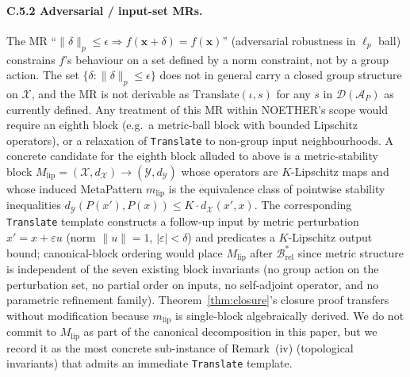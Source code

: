 \documentclass[acmsmall, screen]{acmart}
\begin{document}
\paragraph{C.5.2 Adversarial / input-set MRs.}
The MR ``$\| \delta\|_p \le \epsilon \Rightarrow f(\mathbf{x} + \delta) = f(\mathbf{x})$'' (adversarial robustness in $\ell_p$ ball) constrains $f$'s behaviour on a set defined by a norm constraint, not by a group action. The set $\{ \delta : \|\delta\|_p \le \epsilon\}$ does not in general carry a closed group structure on $\mathcal{X}$, and the MR is not derivable as $\mathrm{Translate}(\iota, s)$ for any $s$ in $\mathcal{D}(\mathcal{A}_P)$ as currently defined. Any treatment of this MR within NOETHER's scope would require an eighth block (e.g.\ a metric-ball block with bounded Lipschitz operators), or a relaxation of \texttt{Translate} to non-group input neighbourhoods. A concrete candidate for the eighth block alluded to above is a metric-stability block $M_{\mathrm{lip}} = (\mathcal{X}, d_{\mathcal{X}}) \to (\mathcal{Y}, d_{\mathcal{Y}})$ whose operators are $K$-Lipschitz maps and whose induced MetaPattern $m_{\mathrm{lip}}$ is the equivalence class of pointwise stability inequalities $d_{\mathcal{Y}}(P(x'), P(x)) \le K \cdot d_{\mathcal{X}}(x', x)$. The corresponding \texttt{Translate} template constructs a follow-up input by metric perturbation $x' = x + \varepsilon u$ (norm $\|u\|=1$, $|\varepsilon| < \delta$) and predicates a $K$-Lipschitz output bound; canonical-block ordering would place $M_{\mathrm{lip}}$ after $\mathcal{B}^{*}_{\mathrm{rel}}$ since metric structure is independent of the seven existing block invariants (no group action on the perturbation set, no partial order on inputs, no self-adjoint operator, and no parametric refinement family). Theorem~\ref{thm:closure}'s closure proof transfers without modification because $m_{\mathrm{lip}}$ is single-block algebraically derived. We do not commit to $M_{\mathrm{lip}}$ as part of the canonical decomposition in this paper, but we record it as the most concrete sub-instance of Remark~(iv) (topological invariants) that admits an immediate \texttt{Translate} template.
\end{document}
